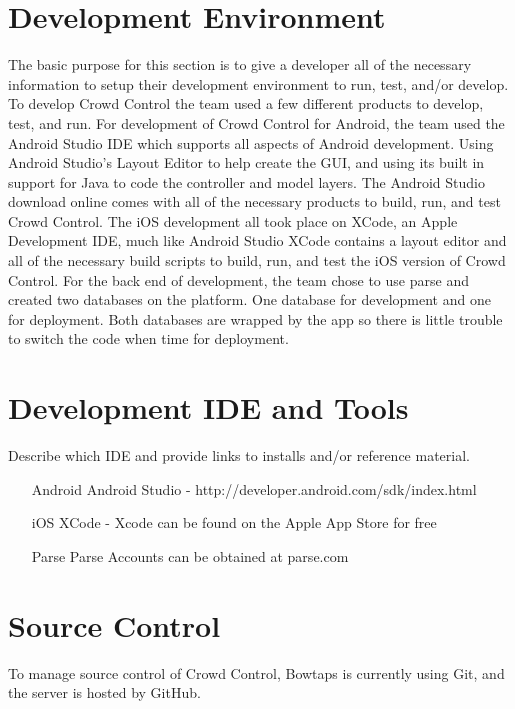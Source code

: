 \section{Development Environment}
The basic purpose for this section is to give a developer all of the necessary 
information to setup their development environment to run, test, and/or develop. 
To develop Crowd Control the team used a few different products to develop, test, and run.  For development of Crowd Control for Android, the team used the Android Studio IDE which supports all aspects of Android development.  Using Android Studio's Layout Editor to help create the GUI, and using its built in support for Java to code the controller and model layers. The Android Studio download online comes with all of the necessary products to build, run, and test Crowd Control. The iOS development all took place on XCode, an Apple Development IDE, much like Android Studio XCode contains a layout editor and all of the necessary build scripts to build, run, and test the iOS version of Crowd Control.  For the back end of development, the team chose to use parse and created two databases on the platform.  One database for development and one for deployment.  Both databases are wrapped by the app so there is little trouble to switch the code when time for deployment.

\section{Development IDE and Tools}
Describe which IDE and provide links to installs and/or reference material. 
\begin{itemize}
\item[Android]
	Android Studio - http://developer.android.com/sdk/index.html
\item[iOS]
	XCode - Xcode can be found on the Apple App Store for free
\item[Parse]
	Parse Accounts can be obtained at parse.com
\end{itemize}

\section{Source Control}
To manage source control of Crowd Control, Bowtaps is currently using Git, and the server is hosted by GitHub.

